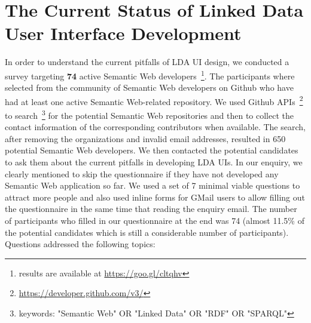 \documentclass{acm_proc_article-sp}
\begin{document}
\section{The Current Status of Linked Data User Interface Development}
In order to understand the current pitfalls of LDA UI design, we conducted a survey targeting \textbf{74} active Semantic Web developers~\footnote{results are available at \url{https://goo.gl/cltqhv}}.
The participants where selected from the community of Semantic Web developers on Github who have had at least one active Semantic Web-related repository.
We used Github APIs~\footnote{\url{https://developer.github.com/v3/}} to search~\footnote{keywords: "Semantic Web" OR "Linked Data" OR "RDF" OR "SPARQL"} for the potential Semantic Web repositories and then to collect the contact information of the corresponding contributors when available.
The search, after removing the organizations and invalid email addresses, resulted in 650 potential Semantic Web developers.
We then contacted the potential candidates to ask them about the current pitfalls in developing LDA UIs.
In our enquiry, we clearly mentioned to skip the questionnaire if they have not developed any Semantic Web application so far.
We used a set of 7 minimal viable questions to attract more people and also used inline forms for GMail users to allow filling out the questionnaire in the same time that reading the enquiry email.
The number of participants who filled in our questionnaire at the end was 74 (almost 11.5\% of the potential candidates which is still a considerable number of participants).
Questions addressed the following topics:
\end{document}
